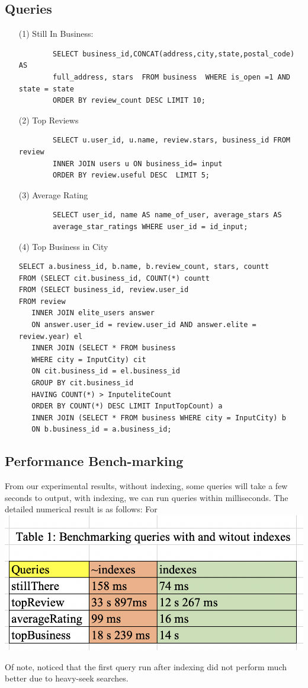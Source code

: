 \documentclass[a4paper, 11pt]{article}
\begin{document}
\subsection{Queries}
		\begin{itemize}
		\item[(1)] Still In Business:
		\begin{verbatim}
		SELECT business_id,CONCAT(address,city,state,postal_code) AS   	
		full_address, stars  FROM business  WHERE is_open =1 AND state = state 
		ORDER BY review_count DESC LIMIT 10;
		\end{verbatim}
		\item[(2)] Top Reviews
		\begin{verbatim}
		SELECT u.user_id, u.name, review.stars, business_id FROM review 
		INNER JOIN users u ON business_id= input 
		ORDER BY review.useful DESC  LIMIT 5;
		\end{verbatim}
		\item[(3)] Average Rating
		\begin{verbatim}
		SELECT user_id, name AS name_of_user, average_stars AS 
		average_star_ratings WHERE user_id = id_input;
		\end{verbatim}
		\item[(4)] Top Business in City
		\begin{verbatim}
SELECT a.business_id, b.name, b.review_count, stars, countt
FROM (SELECT cit.business_id, COUNT(*) countt
FROM (SELECT business_id, review.user_id
FROM review
   INNER JOIN elite_users answer
   ON answer.user_id = review.user_id AND answer.elite = review.year) el
   INNER JOIN (SELECT * FROM business
   WHERE city = InputCity) cit
   ON cit.business_id = el.business_id
   GROUP BY cit.business_id
   HAVING COUNT(*) > InputeliteCount
   ORDER BY COUNT(*) DESC LIMIT InputTopCount) a
   INNER JOIN (SELECT * FROM business WHERE city = InputCity) b 
   ON b.business_id = a.business_id;
		\end{verbatim}
		\end{itemize}
\subsection{Performance Bench-marking}
From our experimental results, without indexing, some queries will take a few seconds to output, with indexing, we can run queries within milliseconds. The detailed numerical result is as follows:
For 
\includegraphics[width=\textwidth]{thisisreal.png}

Of note, noticed that the first query run after indexing did not perform much better due to heavy-seek searches. 
\end{document}
